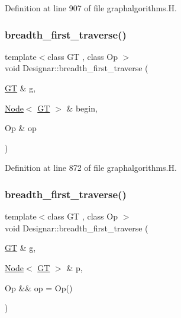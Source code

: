 Definition at line 907 of file graphalgorithms.\+H.

\mbox{\label{namespace_designar_a676f3fbced360c84028f69998e74bede}} 
\subsubsection{\texorpdfstring{breadth\+\_\+first\+\_\+traverse()}{breadth\_first\_traverse()}\hspace{0.1cm}{\footnotesize\ttfamily [1/4]}}
{\footnotesize\ttfamily template$<$class GT , class Op $>$ \\
void Designar\+::breadth\+\_\+first\+\_\+traverse (\begin{DoxyParamCaption}\item[{\hyperlink{demo-buildgraph_8_c_a3001c40d2c31ca87ed96cd7d1334a55e}{GT} \&}]{g,  }\item[{\hyperlink{namespace_designar_a5af326c65aa2bd26b26c410f2030d09e}{Node}$<$ \hyperlink{demo-buildgraph_8_c_a3001c40d2c31ca87ed96cd7d1334a55e}{GT} $>$ \&}]{begin,  }\item[{Op \&}]{op }\end{DoxyParamCaption})}



Definition at line 872 of file graphalgorithms.\+H.

\mbox{\label{namespace_designar_acbf0c7fd2a8cd448777c1d9ee9500e25}} 
\subsubsection{\texorpdfstring{breadth\+\_\+first\+\_\+traverse()}{breadth\_first\_traverse()}\hspace{0.1cm}{\footnotesize\ttfamily [2/4]}}
{\footnotesize\ttfamily template$<$class GT , class Op $>$ \\
void Designar\+::breadth\+\_\+first\+\_\+traverse (\begin{DoxyParamCaption}\item[{\hyperlink{demo-buildgraph_8_c_a3001c40d2c31ca87ed96cd7d1334a55e}{GT} \&}]{g,  }\item[{\hyperlink{namespace_designar_a5af326c65aa2bd26b26c410f2030d09e}{Node}$<$ \hyperlink{demo-buildgraph_8_c_a3001c40d2c31ca87ed96cd7d1334a55e}{GT} $>$ \&}]{p,  }\item[{Op \&\&}]{op = {\ttfamily Op()} }\end{DoxyParamCaption})}



